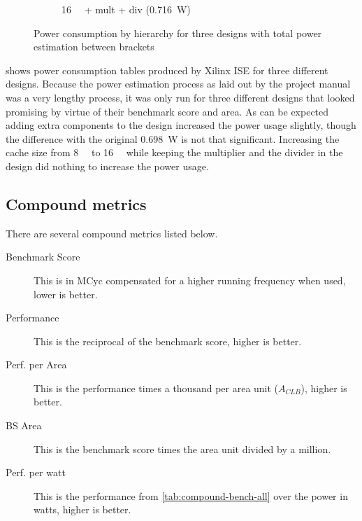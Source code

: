 \documentclass[final]{article}
\begin{document}
\begin{figure}[H]
\begin{subfigure}{.5\textwidth}
  \caption{\SI{16}{\kibi\byte} + mult + div (\SI{0.716}{\watt})}
  \label{fig:16multdivpower}
\end{subfigure}
\caption{Power consumption by hierarchy for three designs with total power estimation between brackets}
\label{fig:powerresults}
\end{figure}

 shows power consumption tables produced by Xilinx ISE for three different designs. Because the power estimation process as laid out by the project manual was a very lengthy process, it was only run for three different designs that looked promising by virtue of their benchmark score and area. As can be expected adding extra components to the design increased the power usage slightly, though the difference with the original \SI{0.698}{\watt} is not that significant. Increasing the cache size from \SI{8}{\kibi\byte} to \SI{16}{\kibi\byte} while keeping the multiplier and the divider in the design did nothing to increase the power usage.

\subsection{Compound metrics}
\label{ssec:compound-metrics}
There are several compound metrics listed below.
\begin{description}

    \item[Benchmark Score] This is in MCyc compensated for a higher running frequency when used, lower is better.
    \item[Performance] This is the reciprocal of the benchmark score, higher is better.
    \item[Perf. per Area] This is the performance times a thousand per area unit ($A_{CLB}$), higher is better.
    \item[BS Area] This is the benchmark score times the area unit divided by a million.
    \item[Perf. per watt] This is the performance from \cref{tab:compound-bench-all} over the power in watts, higher is better.

\end{description}
\end{document}
